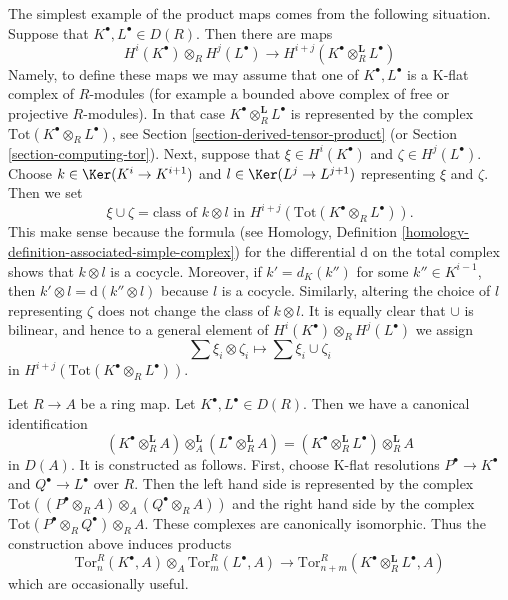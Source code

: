 \noindent
The simplest example of the product maps comes from the following situation.
Suppose that $K^\bullet, L^\bullet \in D(R)$. Then there are maps
\begin{equation}
\label{equation-simple-tor-product}
H^i(K^\bullet) \otimes_R H^j(L^\bullet)
\longrightarrow
H^{i + j}(K^\bullet \otimes_R^{\mathbf{L}} L^\bullet)
\end{equation}
Namely, to define these maps we may assume that one of $K^\bullet, L^\bullet$
is a K-flat complex of $R$-modules (for example a bounded
above complex of free or projective $R$-modules). In that case
$K^\bullet \otimes_R^{\mathbf{L}} L^\bullet$ is represented by the
complex $\text{Tot}(K^\bullet \otimes_R L^\bullet)$, see
Section \ref{section-derived-tensor-product} (or
Section \ref{section-computing-tor}).
Next, suppose that $\xi \in H^i(K^\bullet)$ and $\zeta \in H^j(L^\bullet)$.
Choose $k \in \Ker(K^i \to K^{i + 1})$ and
$l \in \Ker(L^j \to L^{j + 1})$ representing $\xi$ and $\zeta$.
Then we set
$$
\xi \cup \zeta =
\text{class of }k \otimes l\text{ in }
H^{i + j}(\text{Tot}(K^\bullet \otimes_R L^\bullet)).
$$
This make sense because the formula (see
Homology, Definition \ref{homology-definition-associated-simple-complex})
for the differential $\text{d}$ on the total complex shows that
$k \otimes l$ is a cocycle. Moreover, if $k' = d_K(k'')$ for some
$k'' \in K^{i - 1}$, then $k' \otimes l = \text{d}(k'' \otimes l)$
because $l$ is a cocycle. Similarly, altering the choice of $l$
representing $\zeta$ does not change the class of $k \otimes l$.
It is equally clear that $\cup$ is bilinear, and hence
to a general element of $H^i(K^\bullet) \otimes_R H^j(L^\bullet)$
we assign
$$
\sum \xi_i \otimes \zeta_i \longmapsto \sum \xi_i \cup \zeta_i
$$
in $H^{i + j}(\text{Tot}(K^\bullet \otimes_R L^\bullet))$.

\medskip\noindent
Let $R \to A$ be a ring map. Let $K^\bullet, L^\bullet \in D(R)$.
Then we have a canonical identification
\begin{equation}
\label{equation-pullback-derived-tensor-product}
(K^\bullet \otimes_R^{\mathbf{L}} A)
\otimes_A^{\mathbf{L}}
(L^\bullet \otimes_R^{\mathbf{L}} A)
=
(K^\bullet \otimes_R^{\mathbf{L}} L^\bullet) \otimes_R^{\mathbf{L}} A
\end{equation}
in $D(A)$. It is constructed as follows. First, choose K-flat resolutions
$P^\bullet \to K^\bullet$ and $Q^\bullet \to L^\bullet$
over $R$. Then the left hand side is represented by the complex
$\text{Tot}((P^\bullet \otimes_R A) \otimes_A (Q^\bullet \otimes_R A))$
and the right hand side by the complex
$\text{Tot}(P^\bullet \otimes_R Q^\bullet) \otimes_R A$. These
complexes are canonically isomorphic. Thus the construction above
induces products
$$
\text{Tor}^R_n(K^\bullet, A) \otimes_A \text{Tor}^R_m(L^\bullet, A)
\longrightarrow
\text{Tor}_{n + m}^R(K^\bullet \otimes_R^\mathbf{L} L^\bullet, A)
$$
which are occasionally useful.

